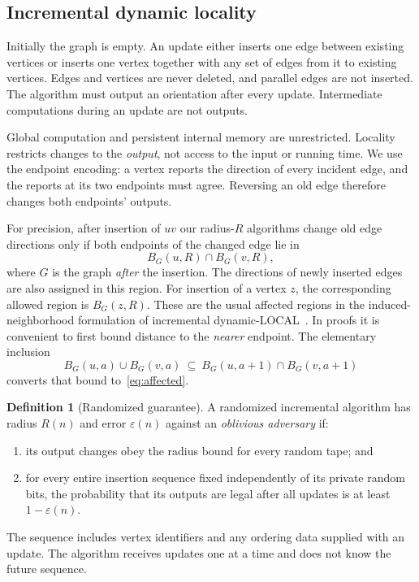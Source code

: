 \documentclass[11pt]{article}
\theoremstyle{definition}
\newtheorem{definition}[theorem]{Definition}
\newcommand{\Dyn}{\textnormal{dynamic-LOCAL}}
\begin{document}
\subsection{Incremental dynamic locality}

Initially the graph is empty. An update either inserts one edge between
existing vertices or inserts one vertex together with any set of edges from
it to existing vertices. Edges and vertices are never deleted, and parallel
edges are not inserted. The algorithm must output an orientation after every
update. Intermediate computations during an update are not outputs.

Global computation and persistent internal memory are unrestricted. Locality
restricts changes to the \emph{output}, not access to the input or running
time. We use the endpoint encoding: a vertex reports the direction of every
incident edge, and the reports at its two endpoints must agree. Reversing an
old edge therefore changes both endpoints' outputs.

For precision, after insertion of $uv$ our radius-$R$ algorithms change old
edge directions only if both endpoints of the changed edge lie in
\begin{equation}\label{eq:affected}
 B_G(u,R)\cap B_G(v,R),
\end{equation}
where $G$ is the graph \emph{after} the insertion. The directions of newly
inserted edges are also assigned in this region. For insertion of a vertex
$z$, the corresponding allowed region is $B_G(z,R)$. These are the usual
affected regions in the induced-neighborhood formulation of incremental
\Dyn\ \cite{models}. In proofs it is convenient to first bound distance to
the \emph{nearer} endpoint. The elementary inclusion
\begin{equation}\label{eq:union-intersection}
 B_G(u,a)\cup B_G(v,a)
 \ \subseteq\ B_G(u,a+1)\cap B_G(v,a+1)
\end{equation}
converts that bound to~\eqref{eq:affected}.

\begin{definition}[Randomized guarantee]\label{def:random}
A randomized incremental algorithm has radius $R(n)$ and error
$\varepsilon(n)$ against an \emph{oblivious adversary} if:
\begin{enumerate}
\item its output changes obey the radius bound for every random tape; and
\item for every entire insertion sequence fixed independently of its private
random bits, the probability that its outputs are legal after all updates
is at least $1-\varepsilon(n)$.
\end{enumerate}
The sequence includes vertex identifiers and any ordering data supplied with
an update. The algorithm receives updates one at a time and does not know
the future sequence.
\end{definition}
\end{document}
